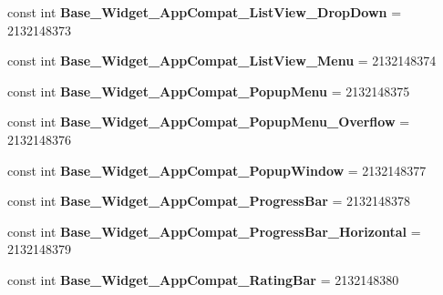 \begin{DoxyCompactItemize}
\item 
\mbox{\label{classst_delivery_1_1_resource_1_1_style_a345d10531fe99185d9780633db75e465}} 
const int {\bfseries Base\+\_\+\+Widget\+\_\+\+App\+Compat\+\_\+\+List\+View\+\_\+\+Drop\+Down} = 2132148373
\item 
\mbox{\label{classst_delivery_1_1_resource_1_1_style_ab24de32c837e45d4742794b8ec627f43}} 
const int {\bfseries Base\+\_\+\+Widget\+\_\+\+App\+Compat\+\_\+\+List\+View\+\_\+\+Menu} = 2132148374
\item 
\mbox{\label{classst_delivery_1_1_resource_1_1_style_a04659ee96ee78d11392190f3004eaffa}} 
const int {\bfseries Base\+\_\+\+Widget\+\_\+\+App\+Compat\+\_\+\+Popup\+Menu} = 2132148375
\item 
\mbox{\label{classst_delivery_1_1_resource_1_1_style_a0decc240137d250de3fb74eaccdb5c4e}} 
const int {\bfseries Base\+\_\+\+Widget\+\_\+\+App\+Compat\+\_\+\+Popup\+Menu\+\_\+\+Overflow} = 2132148376
\item 
\mbox{\label{classst_delivery_1_1_resource_1_1_style_aa0e828ac32dbdf7cc5e5292ffe5d08f5}} 
const int {\bfseries Base\+\_\+\+Widget\+\_\+\+App\+Compat\+\_\+\+Popup\+Window} = 2132148377
\item 
\mbox{\label{classst_delivery_1_1_resource_1_1_style_ac664b9d9afe44e132d25a7b1daa72d3d}} 
const int {\bfseries Base\+\_\+\+Widget\+\_\+\+App\+Compat\+\_\+\+Progress\+Bar} = 2132148378
\item 
\mbox{\label{classst_delivery_1_1_resource_1_1_style_a000d7e60d4b411aa58f03da27c816028}} 
const int {\bfseries Base\+\_\+\+Widget\+\_\+\+App\+Compat\+\_\+\+Progress\+Bar\+\_\+\+Horizontal} = 2132148379
\item 
\mbox{\label{classst_delivery_1_1_resource_1_1_style_a100a6f0ba9c98853b1728888e0a15dc1}} 
const int {\bfseries Base\+\_\+\+Widget\+\_\+\+App\+Compat\+\_\+\+Rating\+Bar} = 2132148380
\item 

\end{DoxyCompactItemize}
